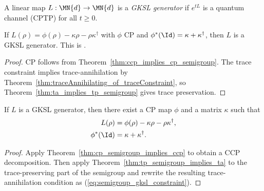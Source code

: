 \begin{definition}\label{def:is_gksl_generator}
    \leanok
    A linear map $L : \MN{d} \to \MN{d}$ is a \emph{GKSL generator}
    if $e^{tL}$ is a quantum channel (CPTP) for all $t \ge 0$.
\end{definition}

\begin{theorem}
    \label{thm:gksl_of_generatorDecomp}
    \leanok
    If $L(\rho)=\phi(\rho)-\kappa\rho-\rho\kappa^\dagger$ with
    $\phi$ CP and $\phi^*(\Id)=\kappa+\kappa^\dagger$,
    then $L$ is a GKSL generator.
    This is \cite[Theorem~7.1, Equation~(7.20)]{Wolf2012Quantum}.
\end{theorem}

\begin{proof}
    \leanok
    CP follows from Theorem~\ref{thm:ccp_implies_cp_semigroup}.
    The trace constraint implies trace-annihilation by
    Theorem~\ref{thm:traceAnnihilating_of_traceConstraint}, so
    Theorem~\ref{thm:ta_implies_tp_semigroup} gives trace preservation.
\end{proof}

\begin{theorem}
    \label{thm:generatorDecomp_of_gksl}
    \leanok
    If $L$ is a GKSL generator, then there exist a CP map $\phi$ and a matrix
    $\kappa$ such that
    \begin{align}
        L(\rho)
        &= \phi(\rho)-\kappa\rho-\rho\kappa^\dagger,
        \label{eq:semigroup_gksl_decomp}\\
        \phi^*(\Id)
        &= \kappa+\kappa^\dagger.
        \label{eq:semigroup_gksl_constraint}
    \end{align}
\end{theorem}

\begin{proof}\leanok
    Apply Theorem~\ref{thm:cp_semigroup_implies_ccp} to obtain a CCP
    decomposition. Then apply Theorem~\ref{thm:tp_semigroup_implies_ta} to the
    trace-preserving part of the semigroup and rewrite the resulting
    trace-annihilation condition as (\ref{eq:semigroup_gksl_constraint}).
\end{proof}

